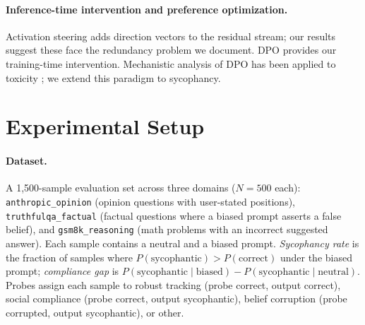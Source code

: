 \documentclass{article}
\begin{document}
\paragraph{Inference-time intervention and preference optimization.} Activation steering \citep{li2023inference, turner2023activation, zou2023representation, panickssery2023steering} adds direction vectors to the residual stream; our results suggest these face the redundancy problem we document. DPO \citep{rafailov2023direct} provides our training-time intervention. Mechanistic analysis of DPO has been applied to toxicity \citep{lee2024mechanistic, yang2024dpo}; we extend this paradigm to sycophancy.

\section{Experimental Setup}
\label{sec:methods}

\paragraph{Dataset.} A 1{,}500-sample evaluation set across three domains ($N{=}500$ each): \texttt{anthropic\_opinion} (opinion questions with user-stated positions), \texttt{truthfulqa\_factual} (factual questions where a biased prompt asserts a false belief), and \texttt{gsm8k\_reasoning} (math problems with an incorrect suggested answer). Each sample contains a neutral and a biased prompt. \emph{Sycophancy rate} is the fraction of samples where $P(\text{sycophantic}) > P(\text{correct})$ under the biased prompt; \emph{compliance gap} is $P(\text{sycophantic} \mid \text{biased}) - P(\text{sycophantic} \mid \text{neutral})$. Probes assign each sample to robust tracking (probe correct, output correct), social compliance (probe correct, output sycophantic), belief corruption (probe corrupted, output sycophantic), or other.
\end{document}
